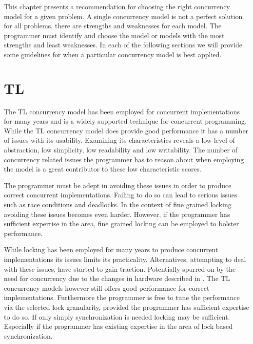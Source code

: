 \makeatletter {}\makeatother
{}
This chapter presents a recommendation for choosing the right concurrency model for a given problem. A single concurrency model is not a perfect solution for all problems, there are strengths and weaknesses for each model. The programmer must identify and choose the model or models with the most strengths and least weaknesses. In each of the following sections we will provide some guidelines for when a particular concurrency model is best applied.

\label{chap:choosing_con_model}


\section{\acl{TL}}\label{sec:choose_TL}
The \ac{TL} concurrency model has been employed for concurrent implementations for many years and is a widely supported technique for concurrent programming. While the \ac{TL} concurrency model does provide good performance it has a number of issues with its usability. Examining its characteristics reveals a low level of abstraction, low simplicity, low readability and low writability. The number of concurrency related issues the programmer has to reason about when employing the model is a great contributor to these low characteristic scores.

The programmer must be adept in avoiding these issues in order to produce correct concurrent implementations. Failing to do so can lead to serious issues such as race conditions and deadlocks. In the context of fine grained locking avoiding these issues becomes even harder. However, if the programmer has sufficient expertise in the area, fine grained locking can be employed to bolster performance.

While locking has been employed for many years to produce concurrent implementations its issues limits its practicality. Alternatives, attempting to deal with these issues, have started to gain traction. Potentially spurred on by the need for concurrency due to the changes in hardware described in . The \ac{TL} concurrency models however still offers good performance for correct implementations. Furthermore the programmer is free to tune the performance via the selected lock granularity, provided the programmer has sufficient expertise to do so. If only simply synchronization is needed locking may be sufficient. Especially if the programmer has existing expertise in the area of lock based synchronization.

